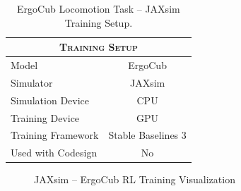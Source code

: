 \begin{table}
    \centering
    \begin{tabular}{l c}
        \toprule
        \multicolumn{2}{c}{\textsc{Training Setup}} \\
        \midrule
        Model              & ErgoCub                \\
        Simulator          & JAXsim                 \\
        Simulation Device  & CPU                    \\
        Training Device    & GPU                    \\
        Training Framework & Stable Baselines 3     \\
        Used with Codesign & No                     \\
        \bottomrule
    \end{tabular}
    \caption{ErgoCub Locomotion Task -- JAXsim Training Setup.}
\end{table}

\begin{figure}
    \centering
    \caption{JAXsim -- ErgoCub RL Training Visualization}
    \label{fig:ergocubtraining}
\end{figure}

